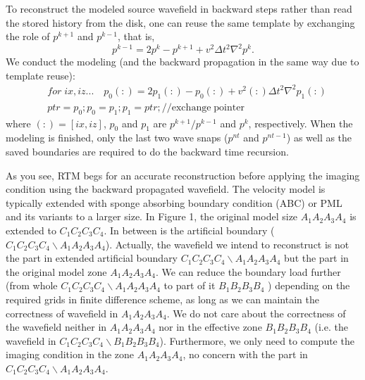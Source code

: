 To reconstruct the modeled source wavefield in backward steps rather than read the stored history from the disk, one can reuse the same template by exchanging the role of $p^{k+1}$ and $p^{k-1}$, that is,
\begin{equation}\label{eq:forward}
p^{k-1}=2p^{k}-p^{k+1}+v^2\Delta t^2 \nabla^2 p^{k}.
\end{equation}
We conduct the modeling (and the backward propagation in the same way due to template reuse):
\begin{displaymath}
\begin{split}
 &for\;ix,iz... \quad p_0(:)=2p_1(:)-p_0(:)+v^2(:)\Delta t^2 \nabla^2 p_1(:)\\
 &ptr=p_0;p_0=p_1;p_1=ptr;// \mathrm{exchange\; pointer}
\end{split}
\end{displaymath}
where $(:)=[ix,iz]$, $p_0$ and $p_1$ are $p^{k+1}/p^{k-1}$ and $p^k$, respectively. When the modeling is finished, only the last two wave snaps ($p^{nt}$ and $p^{nt-1}$) as well as the saved boundaries are required to do the backward time recursion.


As you see, RTM begs for an accurate reconstruction before applying the imaging condition using the backward propagated wavefield. The velocity model is typically extended with sponge absorbing boundary condition (ABC) \citep{cerjan1985nonreflecting} or PML and its variants \citep{komatitsch2007unsplit} to a larger size. In  Figure 1, the original model size $A_1A_2A_3A_4$ is extended to $C_1C_2C_3C_4$. In between is the artificial boundary ($C_1C_2C_3C_4\backslash A_1A_2A_3A_4$).
Actually, the wavefield we intend to reconstruct is not the part in extended artificial boundary $C_1C_2C_3C_4\backslash A_1A_2A_3A_4$ but the part in the original model zone $A_1A_2A_3A_4$. We can reduce the boundary load further (from whole $C_1C_2C_3C_4\backslash A_1A_2A_3A_4$ to part of it $B_1B_2B_3B_4$ ) depending on the required grids in finite difference scheme, as long as we can maintain the correctness of wavefield in $A_1A_2A_3A_4$. We do not care about the correctness of the wavefield neither in $A_1A_2A_3A_4$ nor in the effective zone $B_1B_2B_3B_4$ (i.e. the wavefield in $C_1C_2C_3C_4\backslash B_1B_2B_3B_4$). Furthermore, we only need to compute the imaging condition in the zone $A_1A_2A_3A_4$, no concern with the  part in $C_1C_2C_3C_4\backslash A_1A_2A_3A_4$.


